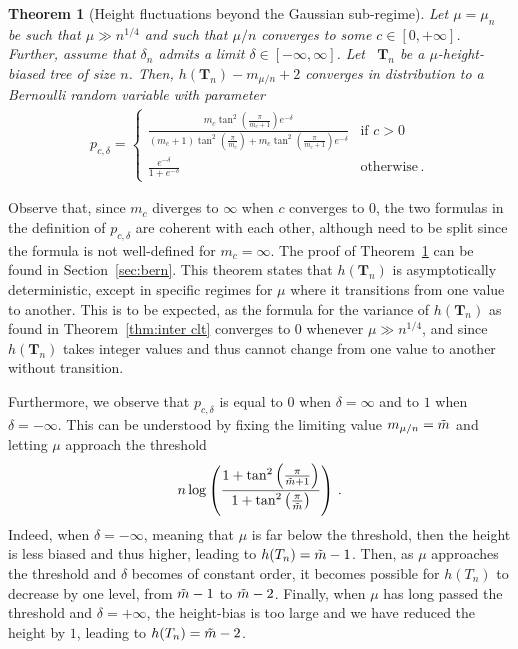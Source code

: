 \documentclass{article}
\newcommand{\1}{\mathbbm{1}}								%
\newtheorem{theorem}{Theorem}[section]
\theoremstyle{definition}
\numberwithin{equation}{section}
\begin{document}
\begin{theorem}[Height fluctuations beyond the Gaussian sub-regime]\label{thm:high lln}
    Let $\mu=\mu_n$ be such that $\mu\gg n^{1/4}$ and such that $\mu/n$ converges to some $c\in[0,+\infty]$.
    Further, assume that $\delta_n$ admits a limit $\delta\in [-\infty,\infty]$.
    Let ~$\mathbf{T}_n$ be a $\mu$-height-biased tree of size $n$.
    Then, $h(\mathbf{T}_n)-m_{\mu/n}+2$ converges in distribution to a Bernoulli random variable with parameter
    \begin{align*}
        p_{c,\delta}=\left\{\begin{array}{ll}
            \displaystyle\frac{m_c\tan^2\left(\frac{\pi}{m_c+1}\right)e^{-\delta}}{(m_c+1)\tan^2\left(\frac{\pi}{m_c}\right)+m_c\tan^2\left(\frac{\pi}{m_c+1}\right)e^{-\delta}} & \textrm{if $c>0$} \\
            \displaystyle\frac{e^{-\delta}}{1+e^{-\delta}} & \textrm{otherwise}\,.
        \end{array}\right.
    \end{align*}
\end{theorem}
Observe that, since $m_c$ diverges to $\infty$ when $c$ converges to $0$, the two formulas in the definition of $p_{c,\delta}$ are coherent with each other, although need to be split since the formula is not well-defined for $m_c=\infty$.
The proof of Theorem~\ref{thm:high lln} can be found in Section~\ref{sec:bern}.
This theorem states that $h(\mathbf{T}_n)$ is asymptotically deterministic, except in specific regimes for $\mu$ where it transitions from one value to another.
This is to be expected, as {the formula for} the variance of $h(\mathbf{T}_n)$ {as found in Theorem~\ref{thm:inter clt}} converges to $0$ whenever $\mu\gg n^{1/4}$, and since $h(\mathbf{T}_n)$ takes integer values and thus cannot change from one value to another without transition. 

Furthermore, we observe that $p_{c,\delta}$ is equal to $0$ when $\delta=\infty$ and to $1$ when $\delta=-\infty$.
This can be understood by fixing the limiting value $m_{\mu/n}=\Tilde{m}$ and letting $\mu$ approach the threshold
\begin{align*}
        n\log\left(\frac{1+\tan^2\left(\frac{\pi}{\Tilde{m}+1}\right)}{1+\tan^2\left(\frac{\pi}{\Tilde{m}}\right)}\right)\,.
\end{align*}
Indeed, when $\delta=-\infty$, meaning that $\mu$ is far below the threshold, then the height is less biased and thus higher, leading to $h(T_n)=\Tilde{m}-1$.
Then, as $\mu$ approaches the threshold and $\delta$ becomes of constant order, it becomes possible for $h(T_n)$ to decrease by one level, from $\Tilde{m}-1$ to $\Tilde{m}-2$.
Finally, when $\mu$ has long passed the threshold and $\delta=+\infty$, the height-bias is too large and we have reduced the height by $1$, leading to $h(T_n)=\Tilde{m}-2$.
\end{document}
